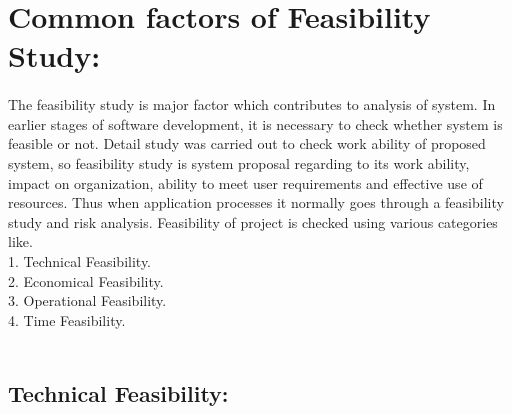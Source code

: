 \documentclass[11pt,a4paper]{report}
\begin{document}
\section{Common factors of Feasibility Study:}
\paragraph{}The feasibility study is major factor which contributes to analysis of system. In earlier stages of software
development, it is necessary to check whether system is feasible or not. Detail study was carried out to
check work ability of proposed system, so feasibility study is system proposal regarding to its work ability,
impact on organization, ability to meet user requirements and effective use of resources. Thus when
application processes it normally goes through a feasibility study and risk analysis.
Feasibility of project is checked using various categories like.\\
1. Technical Feasibility.\\
2. Economical Feasibility.\\
3. Operational Feasibility.\\
4. Time Feasibility.\\
\\
\subsection{Technical Feasibility:}
\end{document}
